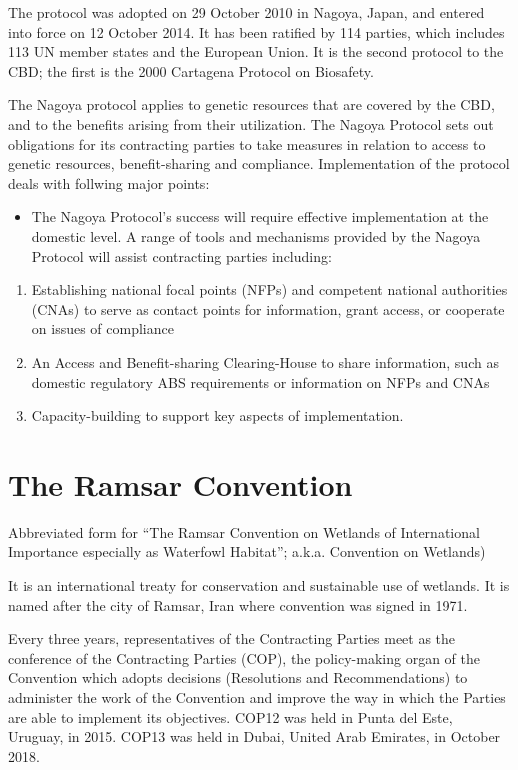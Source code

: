 \documentclass[
]{book}
\providecommand{\tightlist}{%
  \setlength{\itemsep}{0pt}\setlength{\parskip}{0pt}}
\begin{document}
The protocol was adopted on 29 October 2010 in Nagoya, Japan, and entered into force on 12 October 2014. It has been ratified by 114 parties, which includes 113 UN member states and the European Union. It is the second protocol to the CBD; the first is the 2000 Cartagena Protocol on Biosafety.

The Nagoya protocol applies to genetic resources that are covered by the CBD, and to the benefits arising from their utilization. The Nagoya Protocol sets out obligations for its contracting parties to take measures in relation to access to genetic resources, benefit-sharing and compliance. Implementation of the protocol deals with follwing major points:

\begin{itemize}
\tightlist
\item
  The Nagoya Protocol's success will require effective implementation at the domestic level. A range of tools and mechanisms provided by the Nagoya Protocol will assist contracting parties including:
\end{itemize}

\begin{enumerate}
\def\labelenumi{\arabic{enumi}.}
\tightlist
\item
  Establishing national focal points (NFPs) and competent national authorities (CNAs) to serve as contact points for information, grant access, or cooperate on issues of compliance
\item
  An Access and Benefit-sharing Clearing-House to share information, such as domestic regulatory ABS requirements or information on NFPs and CNAs
\item
  Capacity-building to support key aspects of implementation.
\end{enumerate}

\hypertarget{the-ramsar-convention}{%
\section{The Ramsar Convention}\label{the-ramsar-convention}}

Abbreviated form for ``The Ramsar Convention on Wetlands of International Importance especially as Waterfowl Habitat''; a.k.a. Convention on Wetlands)

It is an international treaty for conservation and sustainable use of wetlands. It is named after the city of Ramsar, Iran where convention was signed in 1971.

Every three years, representatives of the Contracting Parties meet as the conference of the Contracting Parties (COP), the policy-making organ of the Convention which adopts decisions (Resolutions and Recommendations) to administer the work of the Convention and improve the way in which the Parties are able to implement its objectives. COP12 was held in Punta del Este, Uruguay, in 2015. COP13 was held in Dubai, United Arab Emirates, in October 2018.
\end{document}
